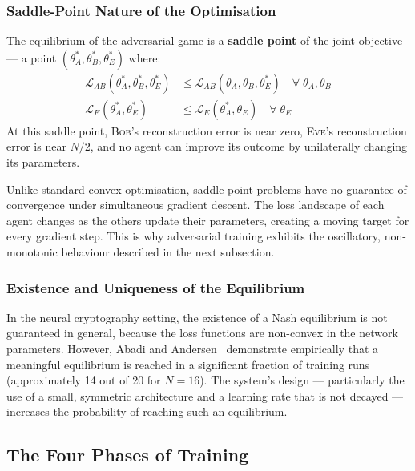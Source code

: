 \documentclass[12pt, a4paper]{article}
\newcommand{\bob}{\textsc{Bob}}
\newcommand{\eve}{\textsc{Eve}}
\newcommand{\thetaA}{\theta_{\!A}}
\newcommand{\thetaB}{\theta_{\!B}}
\newcommand{\thetaE}{\theta_{\!E}}
\begin{document}
\subsubsection*{Saddle-Point Nature of the Optimisation}

The equilibrium of the adversarial game is a \textbf{saddle point} of the
joint objective --- a point $(\thetaA^*, \thetaB^*, \thetaE^*)$ where:
%
\begin{align}
  \mathcal{L}_{AB}(\thetaA^*, \thetaB^*, \thetaE^*)
    &\leq \mathcal{L}_{AB}(\thetaA, \thetaB, \thetaE^*)
    \quad \forall\; \thetaA, \thetaB
    \label{eq:saddle_ab} \\[4pt]
  \mathcal{L}_E(\thetaA^*, \thetaE^*)
    &\leq \mathcal{L}_E(\thetaA^*, \thetaE)
    \quad \forall\; \thetaE
    \label{eq:saddle_e}
\end{align}
%
At this saddle point, \bob{}'s reconstruction error is near zero,
\eve{}'s reconstruction error is near $N/2$, and no agent can
improve its outcome by unilaterally changing its parameters.

Unlike standard convex optimisation, saddle-point problems have no
guarantee of convergence under simultaneous gradient descent. The
loss landscape of each agent changes as the others update their
parameters, creating a moving target for every gradient step. This
is why adversarial training exhibits the oscillatory, non-monotonic
behaviour described in the next subsection.

\subsubsection*{Existence and Uniqueness of the Equilibrium}

In the neural cryptography setting, the existence of a Nash equilibrium
is not guaranteed in general, because the loss functions are non-convex
in the network parameters. However, Abadi and
Andersen~\cite{abadi2016learning} demonstrate empirically that a
meaningful equilibrium is reached in a significant fraction of training
runs (approximately 14 out of 20 for $N=16$). The system's design ---
particularly the use of a small, symmetric architecture and a learning
rate that is not decayed --- increases the probability of reaching
such an equilibrium.

\subsection{The Four Phases of Training}
\label{subsec:four_phases}
\end{document}
